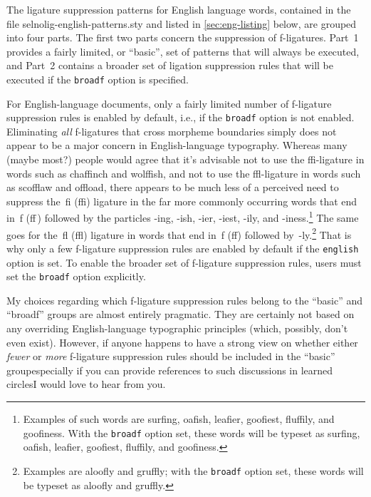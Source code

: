 \documentclass[11pt]{article}
\newcommand{\pkg}[1]{\textsf{#1}}
\newcommand{\opt}[1]{\texttt{#1}}
\begin{document}
The ligature suppression patterns for English language words, contained in the file \pkg{selnolig-english-patterns.sty} and listed in \cref{sec:eng-listing} below, are grouped into four parts. The first two parts concern the suppression of f-ligatures. Part~1 provides a fairly limited, or \enquote{basic}, set of patterns that will always be executed, and Part~2 contains a broader set of ligation suppression rules that will be executed if the \opt{broadf} option is specified. 

For English-language documents, only a fairly limited number of f-ligature suppression rules is enabled by default, i.e., if the \opt{broadf} option is not enabled. Eliminating \emph{all} f-ligatures that cross morpheme boundaries simply does not appear to be a major concern in English-language typography. Whereas many (maybe most?) people would agree that it's advisable not to use the ffi-ligature in words such as chaffinch and wolffish, and not to use the ffl-ligature in words such as scofflaw and offload, there appears to be much less of a perceived need to suppress the~fi (ffi) ligature in the far more commonly occurring words that end in~f (ff\,) followed by the particles -ing, -ish, -ier, -iest, -ily, and -iness.\footnote{Examples of such words are sur\mbox{fi}ng, oa\mbox{fi}sh, lea\mbox{fi}er, goo\mbox{fi}est, flu\mbox{ffi}ly, and goo\mbox{fi}ness. With the \opt{broadf} option set, these words will be typeset as surfing, oafish, leafier, goofiest, fluffily, and goofiness.} The same goes for the~fl (ffl) ligature in words that end in~f (ff) followed by~-ly.\footnote{Examples are \mbox{aloofly} and \mbox{gruffly}; with the \opt{broadf} option set, these words will be typeset as aloofly and gruffly.} That is why only a few f-ligature suppression rules are enabled by default if the \opt{english} option is set. To enable the broader set of f-ligature suppression rules, users must set the \opt{broadf} option explicitly.

My choices regarding which f-ligature suppression rules belong to the \enquote{basic} and \enquote{broadf} groups are almost entirely pragmatic. They are certainly not based on any overriding English-language typographic principles (which, possibly, don't even exist). However, if anyone happens to have a strong view on whether either \emph{fewer} or \emph{more} f-ligature suppression rules should be included in the \enquote{basic} group\textemdash especially if you can provide references to such discussions in learned circles\textemdash I would love to hear from you.
\end{document}

